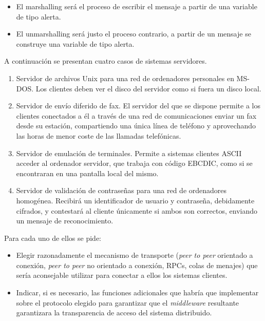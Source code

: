 \begin{problem}[13]
\begin{itemize}
        \item El marshalling será el proceso de escribir el mensaje a partir de una variable de tipo alerta.

        \item El unmarshalling será justo el proceso contrario, a partir de un mensaje se construye una variable de tipo alerta.
      \end{itemize}

      \end{problem}

  \begin{problem}[14]
  A continuación se presentan cuatro casos de sistemas servidores.
  \begin{enumerate}
    \item Servidor de archivos Unix para una red de ordenadores personales en MS-DOS.
    Los clientes deben ver el disco del servidor como si fuera un disco local.
    \item Servidor de envío diferido de fax. El servidor del que se dispone permite a
los clientes conectados a él a través de una red de comunicaciones enviar un
fax desde su estación, compartiendo una única línea de teléfono y aprovechando
las horas de menor coste de las llamadas telefónicas.
    \item Servidor de emulación de terminales. Permite a sistemas clientes
ASCII acceder al ordenador servidor, que trabaja con código EBCDIC, como si se
encontraran en una pantalla local del mismo.
    \item Servidor de validación de contraseñas para una red de ordenadores
homogénea. Recibirá un identificador de usuario y contraseña, debidamente
cifrados, y contestará al cliente únicamente si ambos son correctos, enviando un mensaje de reconocimiento.
  \end{enumerate}
  Para cada uno de ellos se pide:
  \begin{itemize}
    \item Elegir razonadamente el mecanismo de transporte (\textit{peer to peer} orientado a conexión, \textit{peer to peer }no orientado a conexión, RPCs, colas de menajes) que sería aconsejable utilizar para conectar a ellos los sistemas clientes.
    \item Indicar, si es necesario, las funciones adicionales que
habría que implementar sobre el protocolo elegido para garantizar que el
 \textit{middleware }resultante garantizara la transparencia de acceso del sistema distribuido.
  \end{itemize}
    \solution



\end{problem}
